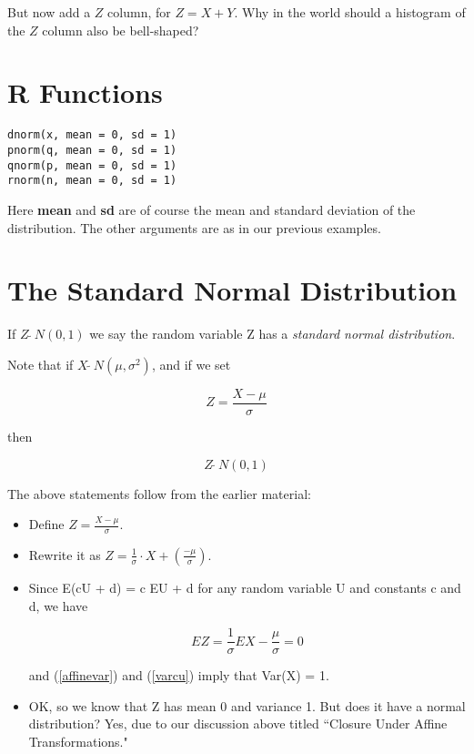 But now add a $Z$ column, for $Z = X + Y$.  Why in the world should a
histogram of the $Z$ column also be bell-shaped?

\section{R Functions}

\begin{lstlisting}
dnorm(x, mean = 0, sd = 1)
pnorm(q, mean = 0, sd = 1)
qnorm(p, mean = 0, sd = 1)
rnorm(n, mean = 0, sd = 1)
\end{lstlisting}

Here {\bf mean} and {\bf sd} are of course the mean and standard
deviation of the distribution.  The other arguments are as in our
previous examples.

\section{The Standard Normal Distribution}
\label{stdnorm}

\begin{definition}

If $Z ~ \widetilde{} ~ N(0,1)$ we say the random variable Z has a {\it
standard normal distribution}.

Note that if $X ~ \widetilde{} ~ N(\mu,\sigma^2)$, and if we set

\begin{equation}
Z = \frac{X - \mu}{\sigma}
\end{equation}

then 

\begin{equation}
\label{zisn01}
Z ~ \widetilde{} ~ N(0,1)
\end{equation}

\end{definition}

The above statements follow from the earlier material:

\begin{itemize}

\item Define $Z = \frac{X - \mu}{\sigma}$.

\item Rewrite it as $Z = \frac{1}{\sigma} \cdot X +
(\frac{-\mu}{\sigma})$.

\item Since E(cU + d) = c EU + d for any random variable U and constants
c and d, we have

\begin{equation}
EZ = \frac{1}{\sigma} EX - \frac{\mu}{\sigma} = 0
\end{equation}

and (\ref{affinevar}) and (\ref{varcu}) imply that Var(X) = 1.

\item OK, so we know that Z has mean 0 and variance 1.  But does it have
a normal distribution?  Yes, due to our discussion above titled
``Closure Under Affine Transformations."

\end{itemize}

